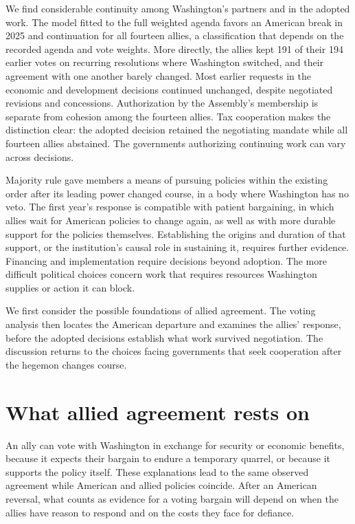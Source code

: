 \documentclass[12pt,authoryear]{elsarticle}
\begin{document}
We find considerable continuity among Washington's partners and in the adopted work. The model fitted to the full weighted agenda favors an American break in 2025 and continuation for all fourteen allies, a classification that depends on the recorded agenda and vote weights. More directly, the allies kept 191 of their 194 earlier votes on recurring resolutions where Washington switched, and their agreement with one another barely changed. Most earlier requests in the economic and development decisions continued unchanged, despite negotiated revisions and concessions. Authorization by the Assembly's membership is separate from cohesion among the fourteen allies. Tax cooperation makes the distinction clear: the adopted decision retained the negotiating mandate while all fourteen allies abstained. The governments authorizing continuing work can vary across decisions.

Majority rule gave members a means of pursuing policies within the existing order after its leading power changed course, in a body where Washington has no veto. The first year's response is compatible with patient bargaining, in which allies wait for American policies to change again, as well as with more durable support for the policies themselves. Establishing the origins and duration of that support, or the institution's causal role in sustaining it, requires further evidence. Financing and implementation require decisions beyond adoption. The more difficult political choices concern work that requires resources Washington supplies or action it can block.

We first consider the possible foundations of allied agreement. The voting analysis then locates the American departure and examines the allies' response, before the adopted decisions establish what work survived negotiation. The discussion returns to the choices facing governments that seek cooperation after the hegemon changes course.

\section{What allied agreement rests on}
\label{sec:theory}

An ally can vote with Washington in exchange for security or economic benefits, because it expects their bargain to endure a temporary quarrel, or because it supports the policy itself. These explanations lead to the same observed agreement while American and allied policies coincide. After an American reversal, what counts as evidence for a voting bargain will depend on when the allies have reason to respond and on the costs they face for defiance.
\end{document}
